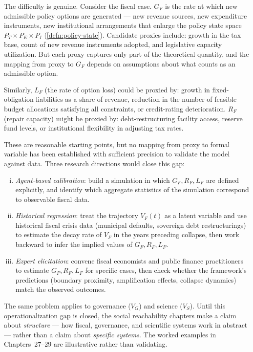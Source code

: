 \documentclass[12pt,twoside,openright]{book}
\begin{document}
The difficulty is genuine. Consider the fiscal case.
$G_F$ is the rate at which new admissible policy options
are generated --- new revenue sources, new expenditure
instruments, new institutional arrangements that enlarge
the policy state space $P_T \times P_E \times P_I$
(\cref{defn:policy-state}). Candidate proxies include:
growth in the tax base, count of new revenue instruments
adopted, and legislative capacity utilization. But each
proxy captures only part of the theoretical quantity, and
the mapping from proxy to $G_F$ depends on assumptions
about what counts as an admissible option.

Similarly, $L_F$ (the rate of option loss) could be proxied
by: growth in fixed-obligation liabilities as a share of
revenue, reduction in the number of feasible budget
allocations satisfying all constraints, or credit-rating
deterioration. $R_F$ (repair capacity) might be proxied
by: debt-restructuring facility access, reserve fund levels,
or institutional flexibility in adjusting tax rates.

These are reasonable starting points, but no mapping from
proxy to formal variable has been established with
sufficient precision to validate the model against data.
Three research directions would close this gap:
\begin{enumerate}[(i)]
  \item \emph{Agent-based calibration}: build a simulation
        in which $G_F, R_F, L_F$ are defined explicitly,
        and identify which aggregate statistics of the
        simulation correspond to observable fiscal data.
  \item \emph{Historical regression}: treat the trajectory
        $V_F(t)$ as a latent variable and use historical
        fiscal crisis data (municipal defaults,
        sovereign debt restructurings) to estimate the
        decay rate of $V_F$ in the years preceding
        collapse, then work backward to infer the
        implied values of $G_F, R_F, L_F$.
  \item \emph{Expert elicitation}: convene fiscal
        economists and public finance practitioners to
        estimate $G_F, R_F, L_F$ for specific cases,
        then check whether the framework's predictions
        (boundary proximity, amplification effects,
        collapse dynamics) match the observed outcomes.
\end{enumerate}
The same problem applies to governance ($V_G$) and science
($V_S$). Until this operationalization gap is closed, the
social reachability chapters make a claim about
\emph{structure} --- how fiscal, governance, and scientific
systems work in abstract --- rather than a claim about
\emph{specific systems}. The worked examples in
Chapters~27--29 are illustrative rather than validating.

\printindex
\end{document}
